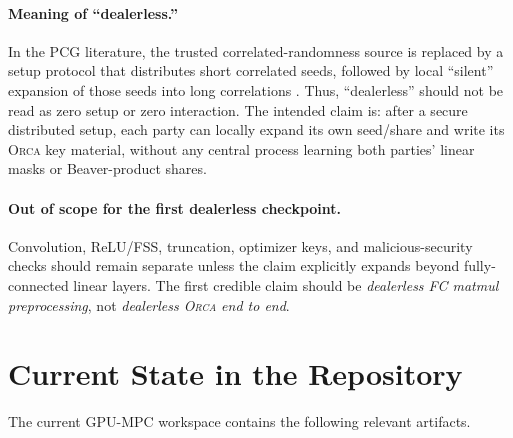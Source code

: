 \documentclass[11pt]{article}
\newcommand{\Orca}{\textsc{Orca}}
\begin{document}
\paragraph{Meaning of ``dealerless.''}
In the PCG literature, the trusted correlated-randomness source is replaced by
a setup protocol that distributes short correlated seeds, followed by local
``silent'' expansion of those seeds into long correlations
\cite{boyle2022ringlpn,boyle2019pcg}. Thus, ``dealerless'' should not be read
as zero setup or zero interaction. The intended claim is: after a secure
distributed setup, each party can locally expand its own seed/share and write
its \Orca{} key material, without any central process learning both parties'
linear masks or Beaver-product shares.

\paragraph{Out of scope for the first dealerless checkpoint.}
Convolution, ReLU/FSS, truncation, optimizer keys, and malicious-security
checks should remain separate unless the claim explicitly expands beyond
fully-connected linear layers. The first credible claim should be
\emph{dealerless FC matmul preprocessing}, not \emph{dealerless \Orca{} end to
end}.

\section{Current State in the Repository}

The current GPU-MPC workspace contains the following relevant artifacts.
\end{document}
